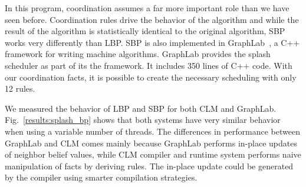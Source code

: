 \begin{dblfig}
\begin{center}
   \end{center}
\vspace*{-1ex}
\end{dblfig}

In this program, coordination assumes a far more important role than
we have seen before. Coordination rules drive the behavior of the
algorithm and while the result of the algorithm is statistically
identical to the original algorithm, SBP works very differently than
LBP.  SBP is also implemented in GraphLab~\cite{GraphLab2010}, a C++
framework for writing machine algorithms.  GraphLab provides the
splash scheduler as part of its the framework. It includes 350 lines
of C++ code.  With our coordination facts, it is possible to create
the necessary scheduling with only 12 rules.

We measured the behavior of LBP and SBP for both CLM and GraphLab.
Fig.~\ref{results:splash_bp} shows that both systems have very similar behavior
when using a variable number of threads.  The differences in performance between
GraphLab and CLM comes mainly because GraphLab performs in-place updates of
neighbor belief values, while CLM compiler and runtime system performs naive
manipulation of facts by deriving rules. The in-place update could be generated
by the compiler using smarter compilation strategies.
